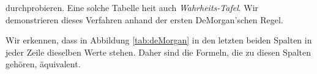 durchprobieren.  Eine solche Tabelle hei\3t auch \emph{Wahrheits-Tafel}.
Wir demonstrieren dieses Verfahren anhand der ersten DeMorgan'schen Regel.
\begin{table}[!ht]
  \centering
{}
  \caption{Nachweis der ersten DeMorgan'schen Regel.}
  \label{tab:deMorgan}
\end{table}
Wir erkennen, dass in Abbildung \ref{tab:deMorgan} in den letzten beiden Spalten in jeder Zeile dieselben Werte
stehen.  Daher sind die Formeln, die zu diesen Spalten geh\"{o}ren, \"{a}quivalent.

